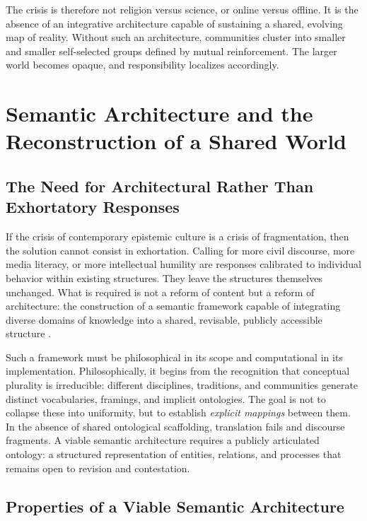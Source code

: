 \documentclass[11pt]{article}
\begin{document}
The crisis is therefore not religion versus science, or online versus offline. It is the absence of an integrative architecture capable of sustaining a shared, evolving map of reality. Without such an architecture, communities cluster into smaller and smaller self-selected groups defined by mutual reinforcement. The larger world becomes opaque, and responsibility localizes accordingly.

\section{Semantic Architecture and the Reconstruction of a Shared World}
\label{sec:architecture}

\subsection{The Need for Architectural Rather Than Exhortatory Responses}

If the crisis of contemporary epistemic culture is a crisis of fragmentation, then the solution cannot consist in exhortation. Calling for more civil discourse, more media literacy, or more intellectual humility are responses calibrated to individual behavior within existing structures. They leave the structures themselves unchanged. What is required is not a reform of content but a reform of architecture: the construction of a semantic framework capable of integrating diverse domains of knowledge into a shared, revisable, publicly accessible structure \citep{Berners-Lee2001}.

Such a framework must be philosophical in its scope and computational in its implementation. Philosophically, it begins from the recognition that conceptual plurality is irreducible: different disciplines, traditions, and communities generate distinct vocabularies, framings, and implicit ontologies. The goal is not to collapse these into uniformity, but to establish \emph{explicit mappings} between them. In the absence of shared ontological scaffolding, translation fails and discourse fragments. A viable semantic architecture requires a publicly articulated ontology: a structured representation of entities, relations, and processes that remains open to revision and contestation.

\subsection{Properties of a Viable Semantic Architecture}
\end{document}
